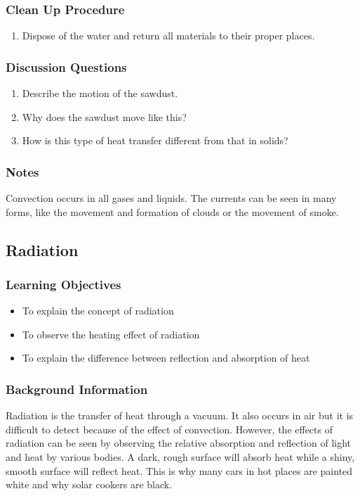 \subsubsection*{Clean Up Procedure}
\begin{enumerate}
\item{Dispose of the water and return all materials to their proper places.}
\end{enumerate}

\subsubsection*{Discussion Questions}
\begin{enumerate}
\item{Describe the motion of the sawdust.}
\item{Why does the sawdust move like this?}
\item{How is this type of heat transfer different from that in solids?}
\end{enumerate}

\subsubsection*{Notes}
Convection occurs in all gases and liquids.  The currents can be seen in many forms, like the movement and formation of clouds or the movement of smoke.

\subsection{Radiation}

\subsubsection*{Learning Objectives}
\begin{itemize}
\item{To explain the concept of radiation}
\item{To observe the heating effect of radiation}
\item{To explain the difference between reflection and absorption of heat}
\end{itemize}

\subsubsection*{Background Information}
Radiation is the transfer of heat through a vacuum.  It also occurs in air but it is difficult to detect because of the effect of convection.
However, the effects of radiation can be seen by observing the relative absorption and reflection of light and heat by various bodies.  A dark, rough surface will absorb heat while a shiny, smooth surface will reflect heat.  This is why many cars in hot places are painted white and why solar cookers are black.

